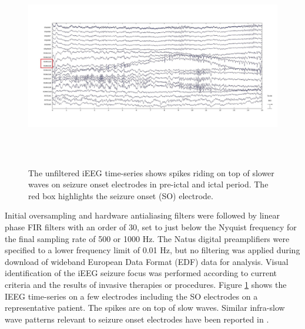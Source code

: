 \begin{figure}
\centerline{
	\includegraphics[height = 3.5in]{Plots/Patient_C_iEEG_rawdata_sample.jpg}
	}
	\caption{The unfiltered iEEG time-series shows spikes riding on top of slower waves on seizure onset electrodes in pre-ictal and ictal period. The red box highlights the seizure onset (SO) electrode.}
	\label{fig:rawdata_patient_c}
\end{figure}

Initial oversampling and hardware antialiasing filters were followed by linear phase FIR filters with an order of 30, set to just below the Nyquist frequency for the final sampling rate of 500 or 1000 Hz. The Natus digital preamplifiers were specified to a lower frequency limit of 0.01 Hz, but no filtering was applied during download of wideband European Data Format (EDF) data for analysis. Visual identification of the iEEG seizure focus was performed according to current criteria \citep{andrzejak2015localization,grinenko2018fingerprint,gnatkovsky2019two} and the results of invasive therapies or procedures. Figure \ref{fig:rawdata_patient_c} shows the IEEG time-series on a few electrodes including the SO electrodes on a representative patient. The spikes are on top of slow waves. Similar infra-slow wave patterns relevant to seizure onset electrodes have been reported in \citep{rampp2012ictal}.



